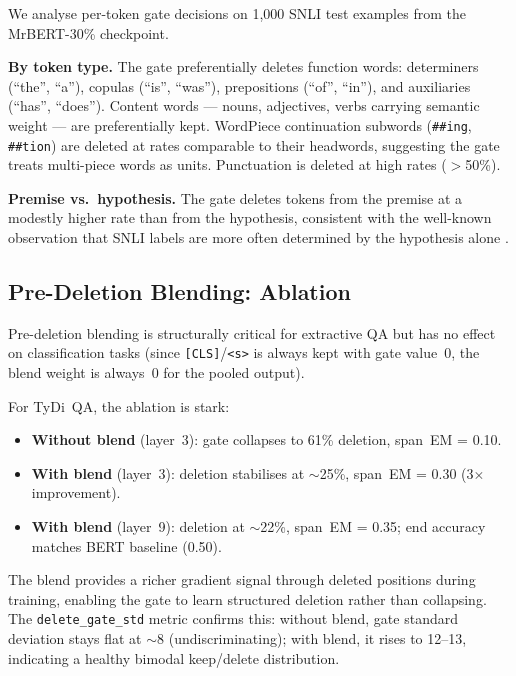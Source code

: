 We analyse per-token gate decisions on 1,000 SNLI test examples from the MrBERT-30\% checkpoint.

\textbf{By token type.}
The gate preferentially deletes function words: determiners (``the'', ``a''), copulas (``is'', ``was''), prepositions (``of'', ``in''), and auxiliaries (``has'', ``does'').
Content words --- nouns, adjectives, verbs carrying semantic weight --- are preferentially kept.
WordPiece continuation subwords (\texttt{\#\#ing}, \texttt{\#\#tion}) are deleted at rates comparable to their headwords, suggesting the gate treats multi-piece words as units.
Punctuation is deleted at high rates ($>$50\%).

\textbf{Premise vs.\ hypothesis.}
The gate deletes tokens from the premise at a modestly higher rate than from the hypothesis, consistent with the well-known observation that SNLI labels are more often determined by the hypothesis alone \citep{bowman2015snli}.


\subsection{Pre-Deletion Blending: Ablation}
\label{sec:predel-ablation}

Pre-deletion blending is structurally critical for extractive QA but has no effect on classification tasks (since \texttt{[CLS]}/\texttt{<s>} is always kept with gate value~0, the blend weight is always~0 for the pooled output).

For TyDi~QA, the ablation is stark:
\begin{itemize}[nosep]
    \item \textbf{Without blend} (layer~3): gate collapses to 61\% deletion, span~EM = 0.10.
    \item \textbf{With blend} (layer~3): deletion stabilises at $\sim$25\%, span~EM = 0.30 (3$\times$ improvement).
    \item \textbf{With blend} (layer~9): deletion at $\sim$22\%, span~EM = 0.35; end accuracy matches BERT baseline (0.50).
\end{itemize}

The blend provides a richer gradient signal through deleted positions during training, enabling the gate to learn structured deletion rather than collapsing.
The \texttt{delete\_gate\_std} metric confirms this: without blend, gate standard deviation stays flat at $\sim$8 (undiscriminating); with blend, it rises to 12--13, indicating a healthy bimodal keep/delete distribution.


